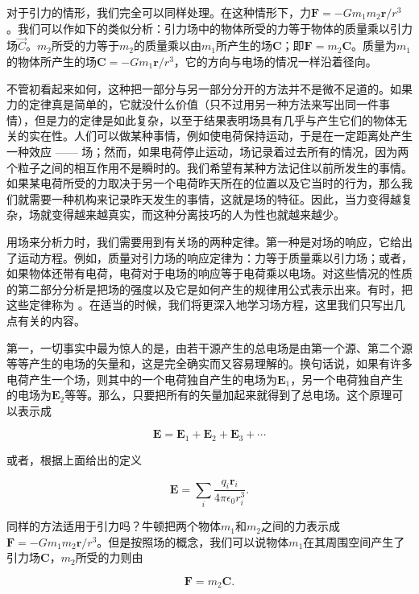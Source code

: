 \documentclass[12pt,oneside]{book}
\providecommand{\FLPvec}[1]{\boldsymbol{#1}}
\providecommand{\FLPC}[0]{\FLPvec{C}}
\providecommand{\FLPE}[0]{\FLPvec{E}}
\providecommand{\FLPF}[0]{\FLPvec{F}}
\providecommand{\FLPr}[0]{\FLPvec{r}}
\begin{document}
对于引力的情形，我们完全可以同样处理。在这种情形下，力$\FLPF=-Gm_1m_2\FLPr/r^3$。我们可以作如下的类似分析：引力场中的物体所受的力等于物体的质量乘以引力场$\vec{C}$。$m_2$所受的力等于$m_2$的质量乘以由$m_1$所产生的场$\FLPC$；即$\FLPF=m_2\FLPC$。质量为$m_1$的物体所产生的场$\FLPC=-Gm_1\FLPr/r^3$，它的方向与电场的情况一样沿着径向。


不管初看起来如何，这种把一部分与另一部分分开的方法并不是微不足道的。如果力的定律真是简单的，它就没什么价值（只不过用另一种方法来写出同一件事情），但是力的定律是如此复杂，以至于结果表明场具有几乎与产生它们的物体无关的实在性。人们可以做某种事情，例如使电荷保持运动，于是在一定距离处产生一种效应 —— 场；然而，如果电荷停止运动，场记录着过去所有的情况，因为两个粒子之间的相互作用不是瞬时的。我们希望有某种方法记住以前所发生的事情。如果某电荷所受的力取决于另一个电荷昨天所在的位置以及它当时的行为，那么我们就需要一种机构来记录昨天发生的事情，这就是场的特征。因此，当力变得越复杂，场就变得越来越真实，而这种分离技巧的人为性也就越来越少。


用场来分析力时，我们需要用到有关场的两种定律。第一种是对场的响应，它给出了运动方程。例如，质量对引力场的响应定律为：力等于质量乘以引力场；或者，如果物体还带有电荷，电荷对于电场的响应等于电荷乘以电场。对这些情况的性质的第二部分分析是把场的强度以及它是如何产生的规律用公式表示出来。有时，把这些定律称为 。在适当的时候，我们将更深入地学习场方程，这里我们只写出几点有关的内容。


第一，一切事实中最为惊人的是，由若干源产生的总电场是由第一个源、第二个源等等产生的电场的矢量和，这是完全确实而又容易理解的。换句话说，如果有许多电荷产生一个场，则其中的一个电荷独自产生的电场为$\FLPE_1$，另一个电荷独自产生的电场为$\FLPE_2$等等。那么，只要把所有的矢量加起来就得到了总电场。这个原理可以表示成


\begin{equation}
\label{Eq:I:12:6}
\FLPE=\FLPE_1+\FLPE_2+\FLPE_3+\dotsb
\end{equation}


或者，根据上面给出的定义


\begin{equation}
\label{Eq:I:12:7}
\FLPE=\sum_i\frac{q_i\FLPr_i}{4\pi\epsilon_0 r_i^3}.
\end{equation}

同样的方法适用于引力吗？牛顿把两个物体$m_1$和$m_2$之间的力表示成$\FLPF=-Gm_1m_2\FLPr/r^3$。但是按照场的概念，我们可以说物体$m_1$在其周围空间产生了引力场$\FLPC$，$m_2$所受的力则由


\begin{equation}
\label{Eq:I:12:8}
\FLPF=m_2\FLPC.
\end{equation}
\end{document}
